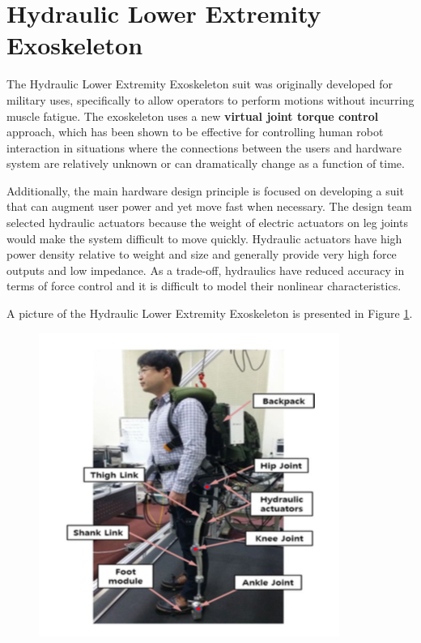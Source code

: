 



% 
\section{Hydraulic Lower Extremity Exoskeleton}

The Hydraulic Lower Extremity Exoskeleton suit was originally developed for military uses, specifically to allow operators to perform motions without incurring muscle fatigue.  The exoskeleton uses a new {\bf virtual joint torque control} approach, which has been shown to be effective for controlling human robot interaction in situations where the connections between the users and hardware system are relatively unknown or can dramatically change as a function of time.

Additionally, the main hardware design principle is focused on developing a suit that can augment user power and yet move fast when necessary.  The design team selected hydraulic actuators because the weight of electric actuators on leg joints would make the system difficult to move quickly.  Hydraulic actuators have high power density relative to weight and size and generally provide very high force outputs and low impedance.  As a trade-off, hydraulics have reduced accuracy in terms of force control and it is difficult to model their nonlinear characteristics.  

A picture of the Hydraulic Lower Extremity Exoskeleton is presented in Figure \ref{fig:exoSuit}.
\begin{figure}[thpb]
\centering
\includegraphics[width=3.in]{exos/figs/hydLowerExrem/exoSuit}
  \caption{}
  \vspace{-0.2in}
 \label{fig:exoSuit}   
 \end{figure} 


